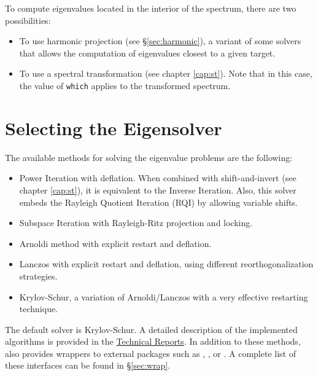 To compute eigenvalues located in the interior of the spectrum, there are two possibilities:
\begin{itemize}
\item To use harmonic projection (see \S\ref{sec:harmonic}), a variant of some solvers that allows the computation of eigenvalues closest to a given target.
\item To use a spectral transformation (see chapter \ref{cap:st}). Note that in this case, the value of \Verb!which! applies to the transformed spectrum.
\end{itemize}

\section{Selecting the Eigensolver}

	The available methods for solving the eigenvalue problems are the following:
\begin{itemize}
\item Power Iteration with deflation. When combined with shift-and-invert (see chapter \ref{cap:st}), it is equivalent to the Inverse Iteration. Also, this solver embeds the Rayleigh Quotient Iteration (RQI) by allowing variable shifts.
\item Subspace Iteration with Rayleigh-Ritz projection and locking.
\item Arnoldi method with explicit restart and deflation.
\item Lanczos with explicit restart and deflation, using different reorthogonalization strategies.
\item Krylov-Schur, a variation of Arnoldi/Lanczos with a very effective restarting technique.
\end{itemize}
The default solver is Krylov-Schur. A detailed description of the implemented algorithms is provided in the \hyperlink{str}{\slepc Technical Reports}. In addition to these methods, \slepc also provides wrappers to external packages such as \arpack, \blzpack, or \trlan. A complete list of these interfaces can be found in \S\ref{sec:wrap}.

